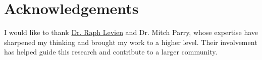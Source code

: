 \section*{Acknowledgements} 
I would like to thank \href{https://levien.com}{Dr. Raph Levien} and Dr. Mitch Parry, whose expertise have sharpened my thinking and brought my work to a higher level. Their involvement has helped guide this research and contribute to a larger community.